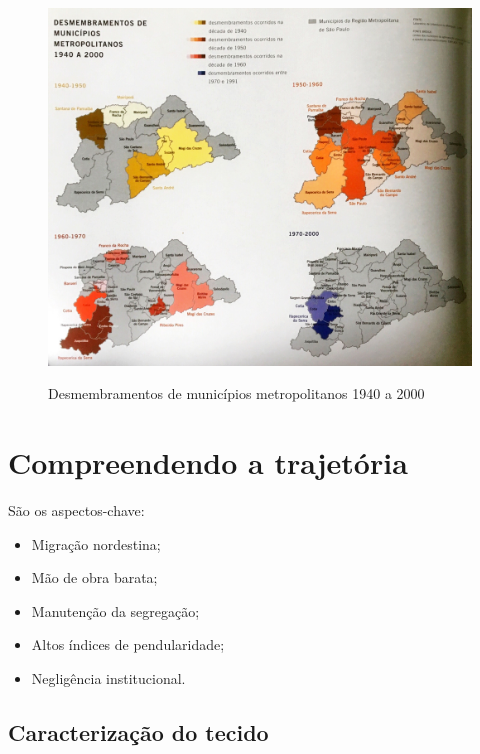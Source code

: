 	\begin{figure}[h]
		\centering
		\caption{Desmembramentos de municípios metropolitanos 1940 a 2000}
		\includegraphics[width=\linewidth,keepaspectratio]{img/spmetrop_pag046}
		\label{spmetrop_pag046}
	\end{figure}
	
	\section{Compreendendo a trajetória} \label{sec:balanco}
	
	São os aspectos-chave: 
	
	\begin{itemize}
		\item Migração nordestina;
		\item Mão de obra barata;
		\item Manutenção da segregação;
		\item Altos índices de pendularidade;
		\item Negligência institucional.
	\end{itemize}
	
	\subsection{Caracterização do tecido}
	
